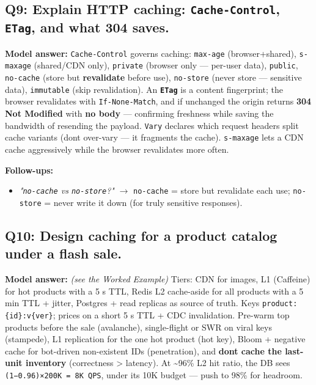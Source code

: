\documentclass[11pt]{article}
\providecommand{\tightlist}{\setlength{\itemsep}{1pt}\setlength{\parskip}{0pt}}
\begin{document}
\subsection{\texorpdfstring{Q9: Explain HTTP caching: \texttt{Cache-Control}, \texttt{ETag}, and what 304 saves.}{Q9: Explain HTTP caching: Cache-Control, ETag, and what 304 saves.}}\label{q9-explain-http-caching-cache-control-etag-and-what-304-saves}

\textbf{Model answer:} \texttt{Cache-Control} governs caching: \texttt{max-age} (browser+shared), \texttt{s-maxage} (shared/CDN only), \texttt{private} (browser only --- per-user data), \texttt{public}, \texttt{no-cache} (store but \textbf{revalidate} before use), \texttt{no-store} (never store --- sensitive data), \texttt{immutable} (skip revalidation). An \textbf{\texttt{ETag}} is a content fingerprint; the browser revalidates with \texttt{If-None-Match}, and if unchanged the origin returns \textbf{304 Not Modified} with \textbf{no body} --- confirming freshness while saving the bandwidth of resending the payload. \texttt{Vary} declares which request headers split cache variants (don\textquotesingle t over-vary --- it fragments the cache). \texttt{s-maxage} lets a CDN cache aggressively while the browser revalidates more often.

\textbf{Follow-ups:}

\begin{itemize}
\tightlist
\item
  \emph{"\texttt{no-cache} vs \texttt{no-store}?"} \(\rightarrow\) \texttt{no-cache} = store but revalidate each use; \texttt{no-store} = never write it down (for truly sensitive responses).
\end{itemize}

\subsection{Q10: Design caching for a product catalog under a flash sale.}\label{q10-design-caching-for-a-product-catalog-under-a-flash-sale}

\textbf{Model answer:} \emph{(see the Worked Example)} Tiers: CDN for images, L1 (Caffeine) for hot products with a 5 s TTL, Redis L2 cache-aside for all products with a 5 min TTL + jitter, Postgres + read replicas as source of truth. Keys \texttt{product:\{id\}:v\{ver\}}; prices on a short 5 s TTL + CDC invalidation. Pre-warm top products before the sale (avalanche), single-flight or SWR on viral keys (stampede), L1 replication for the one hot product (hot key), Bloom + negative cache for bot-driven non-existent IDs (penetration), and \textbf{don\textquotesingle t cache the last-unit inventory} (correctness \textgreater{} latency). At \textasciitilde96\% L2 hit ratio, the DB sees \texttt{(1−0.96)×200K\ =\ 8K\ QPS}, under its 10K budget --- push to 98\% for headroom.
\end{document}
